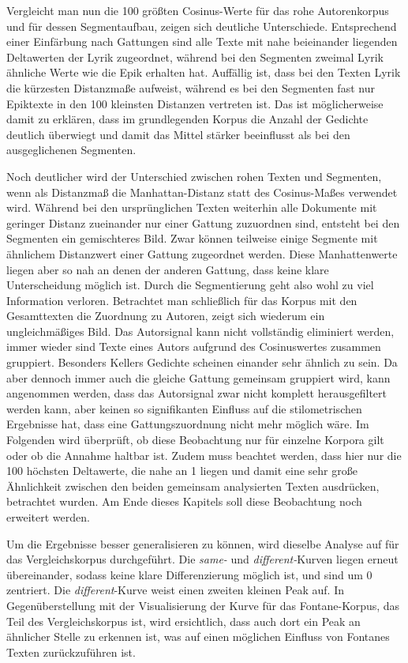 \documentclass[a4paper,10p]{article}
\begin{document}
Vergleicht man nun die 100 größten Cosinus-Werte für das rohe Autorenkorpus und für dessen Segmentaufbau, zeigen sich deutliche Unterschiede. Entsprechend einer Einfärbung nach Gattungen sind alle Texte mit nahe beieinander liegenden Deltawerten der Lyrik zugeordnet, während bei den Segmenten zweimal Lyrik ähnliche Werte wie die Epik erhalten hat. Auffällig ist, dass bei den Texten Lyrik die kürzesten Distanzmaße aufweist, während es bei den Segmenten fast nur Epiktexte in den 100 kleinsten Distanzen vertreten ist. Das ist möglicherweise damit zu erklären, dass im grundlegenden Korpus die Anzahl der Gedichte deutlich überwiegt und damit das Mittel stärker beeinflusst als bei den ausgeglichenen Segmenten. \par 

Noch deutlicher wird der Unterschied zwischen rohen Texten und Segmenten, wenn als Distanzmaß die Manhattan-Distanz statt des Cosinus-Maßes verwendet wird. Während bei den ursprünglichen Texten weiterhin alle Dokumente mit geringer Distanz zueinander nur einer Gattung zuzuordnen sind, entsteht bei den Segmenten ein gemischteres Bild. Zwar können teilweise einige Segmente mit ähnlichem Distanzwert einer Gattung zugeordnet werden. Diese Manhattenwerte liegen aber so nah an denen der anderen Gattung, dass keine klare Unterscheidung möglich ist. Durch die Segmentierung geht also wohl zu viel Information verloren. Betrachtet man schließlich für das Korpus mit den Gesamttexten die Zuordnung zu Autoren, zeigt sich wiederum ein ungleichmäßiges Bild. Das Autorsignal kann nicht vollständig eliminiert werden, immer wieder sind Texte eines Autors aufgrund des Cosinuswertes zusammen gruppiert. Besonders Kellers Gedichte scheinen einander sehr ähnlich zu sein. Da aber dennoch immer auch die gleiche Gattung gemeinsam gruppiert wird, kann angenommen werden, dass das Autorsignal zwar nicht komplett herausgefiltert werden kann, aber keinen so signifikanten Einfluss auf die stilometrischen Ergebnisse hat, dass eine Gattungszuordnung nicht mehr möglich wäre. Im Folgenden wird überprüft, ob diese Beobachtung nur für einzelne Korpora gilt oder ob die Annahme haltbar ist. Zudem muss beachtet werden, dass hier nur die 100 höchsten Deltawerte, die nahe an 1 liegen und damit eine sehr große Ähnlichkeit zwischen den beiden gemeinsam analysierten Texten ausdrücken, betrachtet wurden. Am Ende dieses Kapitels soll diese Beobachtung noch erweitert werden. \par 

Um die Ergebnisse besser generalisieren zu können, wird dieselbe Analyse auf für das Vergleichskorpus durchgeführt. Die \textit{same-} und  \textit{different-}Kurven liegen erneut übereinander, sodass keine klare Differenzierung möglich ist, und sind um 0 zentriert. Die \textit{different}-Kurve weist einen zweiten kleinen Peak auf. In Gegenüberstellung mit der Visualisierung der Kurve für das Fontane-Korpus, das Teil des Vergleichskorpus ist, wird ersichtlich, dass auch dort ein Peak an ähnlicher Stelle zu erkennen ist, was auf einen möglichen Einfluss von Fontanes Texten zurückzuführen ist. \par 
\end{document}
